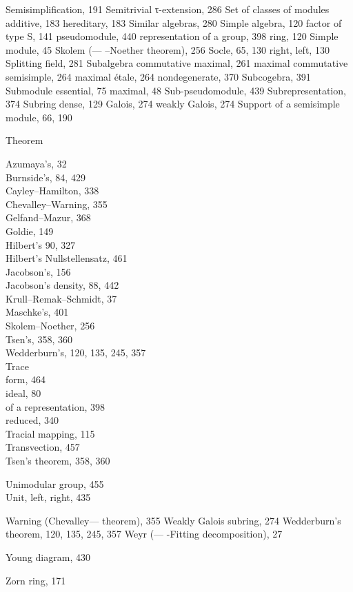 Semisimplification, 191 Semitrivial τ-extension, 286 Set of classes of modules additive, 183 hereditary, 183 Similar algebras, 280 Simple algebra, 120 factor of type S, 141 pseudomodule, 440 representation of a group, 398 ring, 120 Simple module, 45 Skolem (--- --Noether theorem), 256 Socle, 65, 130 right, left, 130 Splitting field, 281 Subalgebra commutative maximal, 261 maximal commutative semisimple, 264 maximal étale, 264 nondegenerate, 370 Subcogebra, 391 Submodule essential, 75 maximal, 48 Sub-pseudomodule, 439 Subrepresentation, 374 Subring dense, 129 Galois, 274 weakly Galois, 274 Support of a semisimple module, 66, 190


Theorem

Azumaya's, 32\\
Burnside's, 84, 429\\
Cayley--Hamilton, 338\\
Chevalley--Warning, 355\\
Gelfand--Mazur, 368\\
Goldie, 149\\
Hilbert's 90, 327\\
Hilbert's Nullstellensatz, 461\\
Jacobson's, 156\\
Jacobson's density, 88, 442\\
Krull--Remak--Schmidt, 37\\
Maschke's, 401\\
Skolem--Noether, 256\\
Tsen's, 358, 360\\
Wedderburn's, 120, 135, 245, 357\\
Trace\\
form, 464\\
ideal, 80\\
of a representation, 398\\
reduced, 340\\
Tracial mapping, 115\\
Transvection, 457\\
Tsen's theorem, 358, 360


Unimodular group, 455\\
Unit, left, right, 435


Warning (Chevalley--- theorem), 355 Weakly Galois subring, 274 Wedderburn's theorem, 120, 135, 245, 357 Weyr (--- -Fitting decomposition), 27


Young diagram, 430


Zorn ring, 171
